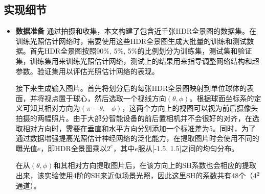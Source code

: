 \subsection{实现细节}
\begin{itemize}
    \item \textbf{数据准备} 通过拍摄和收集，本文构建了包含近千张HDR全景图的数据集。在训练光照估计网络时，需要使用这些HDR全景图生成大批量的训练和测试数据。首先HDR全景图按照90\%, 5\%, 5\%的比例划分为训练集，测试集和验证集，训练集用来训练光照估计网络，测试上的结果用来指导调整网络结构和超参数。验证集用以评估光照估计网络的表现。
    
    接下来生成输入图片。首先将划分后的每张HDR全景图映射到单位球体的表面，并将视点置于球心，然后选取一个视线方向$(\theta, \phi)$。根据球面坐标系的定义可知其相对方向为$(\pi-\theta, -\phi)$，这两个方向上的视图可以视为前后摄像头拍摄的两幅照片。由于大部分智能设备的前后置相机并不会很好的对齐，在选取相对方向时，需要在垂直和水平方向分别添加一个标准差为5。同时，为了通过数据增强提高光照估计神经网络的泛化能力，在提取图片时会使用不同的曝光值$e$，即HDR全景图乘以$2^e$，其中$e$服从[-1.5, 1.5]之间的均匀分布。

    在从$(\theta, \phi)$和其相对方向提取图片后，在该方向上的SH系数也会相应的提取出来，该实验使用4阶的SH来近似场景光照，因此这里SH的系数共有48个（$4^2\time3$通道）。
    

\end{itemize}
